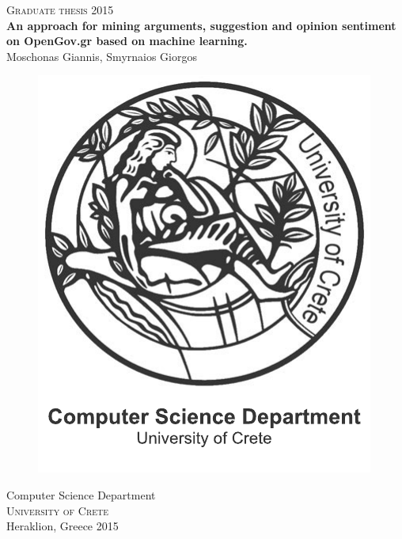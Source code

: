 \newpage
\restoregeometry
\thispagestyle{empty}
\mbox{}


\newpage
\thispagestyle{empty}
\begin{center}
	\textsc{\large Graduate thesis 2015}\\[4cm]		%
	\textbf{\Large An approach for mining arguments, suggestion and opinion sentiment on OpenGov.gr based on machine learning.} \\[1cm]
	{\large Moschonas Giannis, Smyrnaios Giorgos}
	
	\vfill	
	\begin{figure}[H]
	\centering
	\includegraphics[width=0.2\pdfpagewidth]{figure/auxiliary/logo_eng.pdf} \\	
	\end{figure}	\vspace{5mm}	
	
	Computer Science Department \\
	\textsc{University of Crete} \\
	Heraklion, Greece 2015 \\
\end{center}


